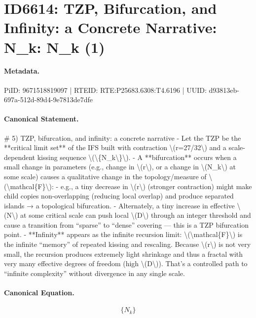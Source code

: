 \section*{ID6614: TZP, Bifurcation, and Infinity: a Concrete Narrative: N\_k: N\_k (1)}
\paragraph{Metadata.}
PiID: 9671518819097 | RTEID: RTE:P25683.6308:T4.6196 | UUID: d93813eb-697a-512d-89d4-9e7813de7dfe

\paragraph{Canonical Statement.}
\# 5) TZP, bifurcation, and infinity: a concrete narrative - Let the TZP be the **critical limit set** of the IFS built with contraction \textbackslash{}(r=27/32\textbackslash{}) and a scale-dependent kissing sequence \textbackslash{}(\textbackslash{}\{N\_k\textbackslash{}\}\textbackslash{}). - A **bifurcation** occurs when a small change in parameters (e.g., change in \textbackslash{}(r\textbackslash{}), or a change in \textbackslash{}(N\_k\textbackslash{}) at some scale) causes a qualitative change in the topology/measure of \textbackslash{}(\textbackslash{}mathcal\{F\}\textbackslash{}): - e.g., a tiny decrease in \textbackslash{}(r\textbackslash{}) (stronger contraction) might make child copies non-overlapping (reducing local overlap) and produce separated islands → a topological bifurcation. - Alternately, a tiny increase in effective \textbackslash{}(N\textbackslash{}) at some critical scale can push local \textbackslash{}(D\textbackslash{}) through an integer threshold and cause a transition from “sparse” to “dense” covering — this is a TZP bifurcation point. - **Infinity** appears as the infinite recursion limit: \textbackslash{}(\textbackslash{}mathcal\{F\}\textbackslash{}) is the infinite “memory” of repeated kissing and rescaling. Because \textbackslash{}(r\textbackslash{}) is not very small, the recursion produces extremely light shrinkage and thus a fractal with very many effective degrees of freedom (high \textbackslash{}(D\textbackslash{})). That’s a controlled path to “infinite complexity” without divergence in any single scale.

\paragraph{Canonical Equation.}
\[
\{N_k\}
\]

